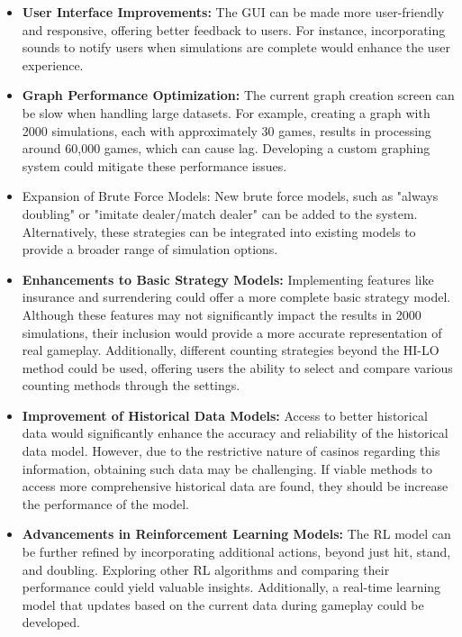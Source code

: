 \documentclass[a4paper,12pt]{report}
\begin{document}
\begin{itemize}
    \item {\textbf{User Interface Improvements:}} The GUI can be made more user-friendly and responsive, offering better feedback to users. For instance, incorporating sounds to notify users when simulations are complete would enhance the user experience.

    \item {\textbf{Graph Performance Optimization:}} The current graph creation screen can be slow when handling large datasets. For example, creating a graph with 2000 simulations, each with approximately 30 games, results in processing around 60,000 games, which can cause lag. Developing a custom graphing system could mitigate these performance issues.
    
    \item {Expansion of Brute Force Models:} New brute force models, such as "always doubling" or "imitate dealer/match dealer" \cite{paper:8} can be added to the system. Alternatively, these strategies can be integrated into existing models to provide a broader range of simulation options.
    
    \item {\textbf{Enhancements to Basic Strategy Models:}} Implementing features like insurance and surrendering could offer a more complete basic strategy model. Although these features may not significantly impact the results in 2000 simulations, their inclusion would provide a more accurate representation of real gameplay. Additionally, different counting strategies beyond the HI-LO method could be used, offering users the ability to select and compare various counting methods through the settings.
    
    \item {\textbf{Improvement of Historical Data Models:}} Access to better historical data would significantly enhance the accuracy and reliability of the historical data model. However, due to the restrictive nature of casinos regarding this information, obtaining such data may be challenging. If viable methods to access more comprehensive historical data are found, they should be increase the performance of the model.
    
    \item {\textbf{Advancements in Reinforcement Learning Models:}} The RL model can be further refined by incorporating additional actions, beyond just hit, stand, and doubling. Exploring other RL algorithms and comparing their performance could yield valuable insights. Additionally, a real-time learning model that updates based on the current data during gameplay could be developed.
\end{itemize}


\printbibliography

\appendix
\end{document}
